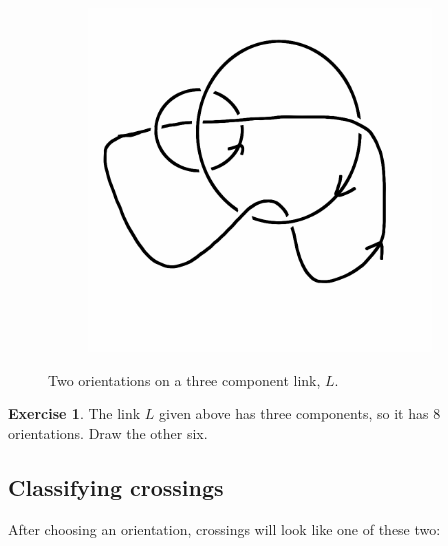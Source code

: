 \documentclass[12pt,letterpaper]{article}
\theoremstyle{definition}
\newtheorem{exercise}[question]{Exercise}
\begin{document}
\begin{figure}[h]
\begin{subfigure}{.3\textwidth}
        \includegraphics[width=\textwidth]{rgp11pics/threelinkb.png}
    \end{subfigure}
    \caption{Two orientations on a three component link, $L$.}
\end{figure}

\begin{exercise}
The link $L$ given above has three components, so it has 8 orientations.
Draw the other six.
\end{exercise}

\clearpage

\subsection*{Classifying crossings}

After choosing an orientation, crossings will look like one of these two:
\end{document}
